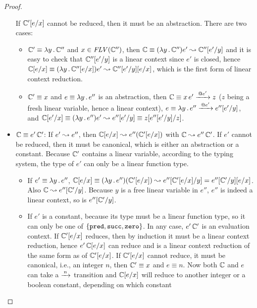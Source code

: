 \documentclass[10pt,a4]{article}
\begin{document}
\begin{proof}
\begin{itemize}
  If $\mathbb{C}'[e/x]$ cannot be reduced, then it must be an abstraction. There are two cases:
  \begin{itemize}
  \item  $\mathbb{C}' \equiv \lambda y \, . \, \mathbb{C}''$ and $x \in \mathit{FLV}(\mathbb{C}'')$, then 
    $\mathbb{C} \equiv (\lambda y \, . \, \mathbb{C}'')e' \leadsto \mathbb{C}''[e'/y]$ and it is easy to check that 
    $\mathbb{C}''[e'/y]$ is a linear context since $e'$ is closed, 
    hence $\mathbb{C}[e/x] \equiv (\lambda y \, . \, \mathbb{C}''[e/x]) e' \leadsto \mathbb{C}''[e'/y][e/x]$, 
    which is the first form of linear context reduction. 
  \item $\mathbb{C}' \equiv x$ and $e \equiv \lambda y \, . \, e''$ is an abstraction, then 
    $\mathbb{C} \equiv x \, e' \xrightarrow{\,{@e'}\,} z$ ($z$ being a fresh linear variable, hence a linear context),
    $e \equiv \lambda y \, . \, e'' \xrightarrow{\,{@e'}\,} e''[e'/y]$, and 
    $\mathbb{C}[e'/x] \equiv (\lambda y \, . \, e'') e' \leadsto e''[e'/y] \equiv z[e''[e'/y]/z]$.
  \end{itemize}
\item $\mathbb{C} \equiv e' \, \mathbb{C}'$:  
  If $e' \leadsto e''$, then $\mathbb{C}[e/x] \leadsto e''(\mathbb{C}'[e/x])$ with 
  $\mathbb{C} \leadsto e'' \, \mathbb{C}'$.
  If $e'$ cannot be reduced, then it must be canonical, which is either an abstraction or a constant. 
  Because $\mathbb{C}'$ contains a linear variable, according to the typing system, the type of $e'$ 
  can only be a linear function type. 
  \begin{itemize}
  \item If $e' \equiv \lambda y \, . \, e''$, 
    $\mathbb{C}[e/x] \equiv (\lambda y \, . \, e'') (\mathbb{C}'[e/x]) \leadsto e''[\mathbb{C}'[e/x] / y] 
    = e''[\mathbb{C}'/y][e/x]$. Also $\mathbb{C} \leadsto e''[\mathbb{C}'/y]$. 
    Because $y$ is a free linear variable in $e''$, $e''$ is indeed a linear context, so is $e''[\mathbb{C}'/y]$.
  \item If $e'$ is a constant, because its type must be a linear function type, so it can only be one 
    of $\{{\mathtt{pred}, \mathtt{succ}, \mathtt{zero}}\}$. In any case, $e' \, \mathbb{C}'$ is an evaluation context. 
    If $\mathbb{C}'[e/x]$ reduces, then by induction it must be a linear context reduction, hence 
    $e' \, \mathbb{C}[e/x]$ can reduce and is a linear context reduction of the same form as of $\mathbb{C}'[e/x]$.
    If $\mathbb{C}'[e/x]$ cannot reduce, it must be canonical, i.e., an integer $n$, then $\mathbb{C}' \equiv x$ 
    and $e \equiv n$. Now both $\mathbb{C}$ and $e$ can take a $\xrightarrow{\,{n}\,}$ transition and 
    $\mathbb{C}[e/x]$ will reduce to another integer or a boolean constant, depending on which constant 

\end{itemize}
\end{itemize}
\end{proof}
\end{document}

